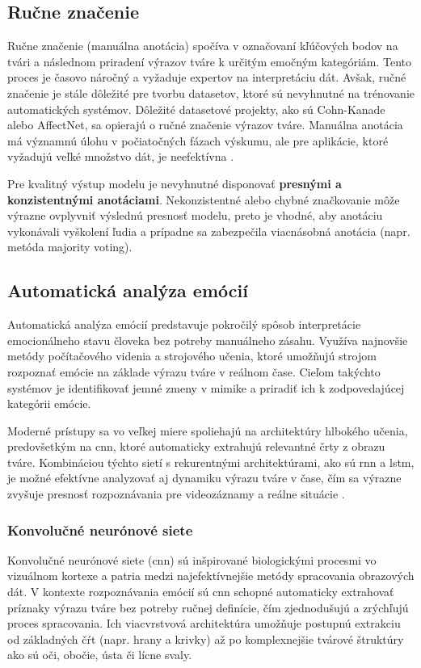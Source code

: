 \subsection{Ručne značenie}
Ručne značenie (manuálna anotácia) spočíva v označovaní kľúčových bodov na tvári a následnom priradení výrazov tváre k určitým emočným kategóriám. Tento proces je časovo náročný a vyžaduje expertov 
na interpretáciu dát. Avšak, ručné značenie je stále dôležité pre tvorbu datasetov, ktoré sú nevyhnutné na trénovanie automatických systémov. Dôležité datasetové projekty, ako sú Cohn-Kanade alebo AffectNet, 
sa opierajú o ručné značenie výrazov tváre. Manuálna anotácia má významnú úlohu v počiatočných fázach výskumu, ale pre aplikácie, ktoré vyžadujú veľké množstvo dát, je neefektívna \cite{article01}.

Pre kvalitný výstup modelu je nevyhnutné disponovať \textbf{presnými a konzistentnými anotáciami}. Nekonzistentné alebo chybné značkovanie môže výrazne ovplyvniť výslednú presnosť modelu, preto je vhodné, 
aby anotáciu vykonávali vyškolení ľudia a prípadne sa zabezpečila viacnásobná anotácia (napr. metóda majority voting).

\subsection{Automatická analýza emócií}

Automatická analýza emócií predstavuje pokročilý spôsob interpretácie emocionálneho stavu človeka bez potreby manuálneho zásahu. Využíva najnovšie metódy počítačového videnia a strojového učenia, ktoré umožňujú strojom rozpoznať emócie na základe výrazu tváre v reálnom čase. Cieľom takýchto systémov je identifikovať jemné zmeny v mimike a priradiť ich k zodpovedajúcej kategórii emócie.

Moderné prístupy sa vo veľkej miere spoliehajú na architektúry hlbokého učenia, predovšetkým na \gls{cnn}, ktoré automaticky extrahujú relevantné črty z obrazu tváre. Kombináciou týchto sietí s rekurentnými architektúrami, ako sú \gls{rnn} a \gls{lstm}, je možné efektívne analyzovať aj dynamiku výrazu tváre v čase, čím sa výrazne zvyšuje presnosť rozpoznávania pre videozáznamy a reálne situácie \cite{article01} \cite{misc01}.

\subsubsection{Konvolučné neurónové siete}

Konvolučné neurónové siete (\gls{cnn}) sú inšpirované biologickými procesmi vo vizuálnom kortexe a patria medzi najefektívnejšie metódy spracovania obrazových dát. V kontexte rozpoznávania emócií sú \gls{cnn} schopné automaticky extrahovať príznaky výrazu tváre bez potreby ručnej definície, čím zjednodušujú a zrýchľujú proces spracovania. Ich viacvrstvová architektúra umožňuje postupnú extrakciu od základných čŕt (napr. hrany a krivky) až po komplexnejšie tvárové štruktúry ako sú oči, obočie, ústa či lícne svaly.

